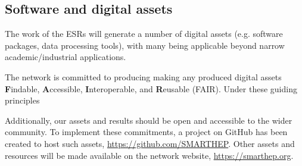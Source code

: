 \subsection{Software and digital assets}
\label{software}
The work of the ESRs will generate a number of digital assets (e.g. software packages, data processing tools), with many being applicable beyond narrow academic/industrial applications. \par %
The network is committed to producing making any produced digital assets \textbf{F}indable, \textbf{A}ccessible, \textbf{I}nteroperable, and \textbf{R}eusable (FAIR). \cite{FAIR-principles} Under these guiding principles\par
Additionally, our assets and results should be open and accessible to the wider community. To implement these commitments, a project on GitHub has been created to host such assets, \url{https://github.com/SMARTHEP}. Other assets and resources will be made available on the network website, \url{https://smarthep.org}.